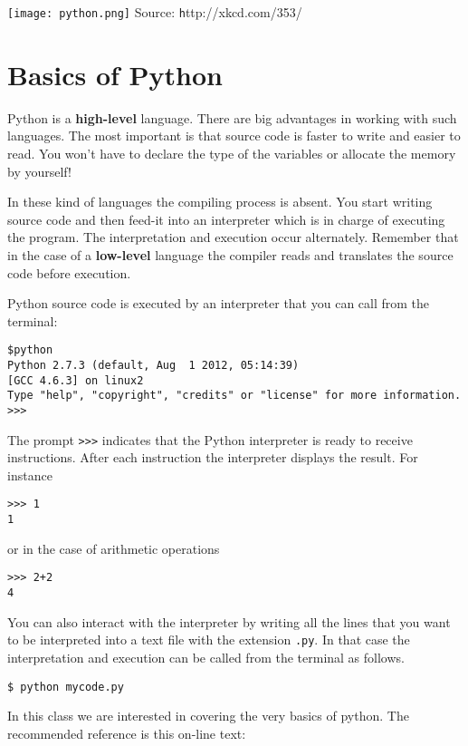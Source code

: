 \documentclass{article}
\begin{document}
\setcounter{section}{2}
\begin{center}
\texttt{[image: python.png]}
Source: {\texttt http://xkcd.com/353/}
\end{center}
\section{Basics of Python}
Python is a {\bf high-level} language. There are big advantages in
working with such languages. The most important is that source code is
faster to write and easier to read. You won't have to declare the type
of the variables or allocate the memory by yourself!

In these kind of languages the compiling process is absent. You start
writing source code and then feed-it into an interpreter which is in
charge of executing the program. The interpretation and execution
occur alternately. Remember that in the case of a {\bf low-level} language the
compiler reads and translates the source code before execution. 

Python source code is executed by an interpreter that you can call
from the terminal: 
\begin{verbatim}
$python
Python 2.7.3 (default, Aug  1 2012, 05:14:39) 
[GCC 4.6.3] on linux2
Type "help", "copyright", "credits" or "license" for more information. 
>>> 
\end{verbatim}

The prompt \verb">>>" indicates that the Python interpreter is ready
to receive instructions. After each instruction the interpreter
displays the result. For instance 

\begin{verbatim}
>>> 1
1
\end{verbatim}

or in the case of arithmetic operations

\begin{verbatim}
>>> 2+2
4
\end{verbatim}

You can also interact with the interpreter by writing all the lines
that you want to be interpreted into a text file with the extension
\verb".py". In that case the interpretation and execution can be called
from the terminal as follows. 

\begin{verbatim}
$ python mycode.py
\end{verbatim}

In this class we are interested in covering the very basics of python. The
recommended reference is this on-line text: 
\end{document}
